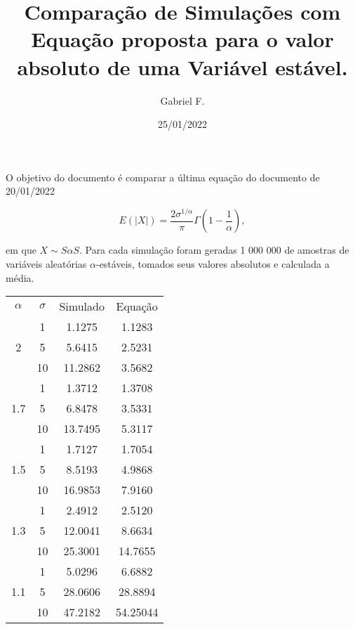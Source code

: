 \documentclass[
]{article}
\title{Comparação de Simulações com Equação proposta para o valor
absoluto de uma Variável estável.}
\author{Gabriel F.}
\date{25/01/2022}
\begin{document}
\maketitle

O objetivo do documento é comparar a última equação do documento de
20/01/2022

\begin{equation}
    E(|X|) = \frac{2 \sigma^{1/\alpha}}{\pi}\Gamma\left(1 - \frac 1 \alpha\right),
\end{equation}

em que \(X \sim S\alpha S\). Para cada simulação foram geradas 1 000 000
de amostras de variáveis aleatórias \(\alpha\)-estáveis, tomados seus
valores absolutos e calculada a média.

\begin{table}[]
\begin{tabular}{cccc}
\cline{1-3}
\multicolumn{1}{|c|}{$\alpha$} & \multicolumn{1}{c|}{$\sigma$} & \multicolumn{1}{c|}{Simulado} & Equação \\ \cline{1-3}
\multirow{3}{*}{2}   & 1  & 1.1275  & 1.1283   \\
                     & 5  & 5.6415  & 2.5231   \\
                     & 10 & 11.2862 & 3.5682   \\
\multirow{3}{*}{1.7} & 1  & 1.3712  & 1.3708   \\
                     & 5  & 6.8478  & 3.5331   \\
                     & 10 & 13.7495 & 5.3117   \\
\multirow{3}{*}{1.5} & 1  & 1.7127  & 1.7054   \\
                     & 5  & 8.5193  & 4.9868   \\
                     & 10 & 16.9853 & 7.9160   \\
\multirow{3}{*}{1.3} & 1  & 2.4912  & 2.5120   \\
                     & 5  & 12.0041 & 8.6634   \\
                     & 10 & 25.3001 & 14.7655  \\
\multirow{3}{*}{1.1} & 1  & 5.0296  & 6.6882   \\
                     & 5  & 28.0606 & 28.8894  \\
                     & 10 & 47.2182 & 54.25044
\end{tabular}
\end{table}
\end{document}
